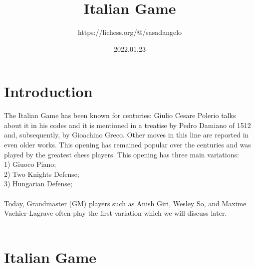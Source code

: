 \documentclass{article}
\title{Italian Game}
\author{https://lichess.org/@/sasadangelo}
\date{2022.01.23}
\begin{document}
\begin{titlepage}
\maketitle
\end{titlepage}
\section{ Introduction}

The Italian Game has been known for centuries: Giulio Cesare Polerio talks about it in his codes and it is mentioned in a treatise by Pedro Damiano of 1512 and, subsequently, by Gioachino Greco. Other moves in this line are reported in even older works. This opening has remained popular over the centuries and was played by the greatest chess players. This opening has three main variations:\\1) Giuoco Piano;\\2) Two Knights Defense;\\3) Hungarian Defense;\\\\Today, Grandmaster (GM) players such as Anish Giri, Wesley So, and Maxime Vachier-Lagrave often play the first variation which we will discuss later.\\
\\
\section{ Italian Game}
\end{document}
